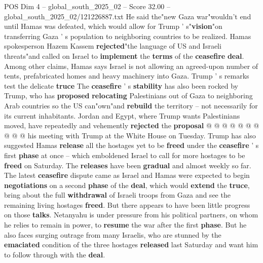 \begin{textsample}{POS Dim 4 – global\_south\_2025\_02 – Score 32.00 – global\_south\_2025\_02/121226887.txt}
He said the"new Gaza war"wouldn't end until Hamas was defeated, which would allow for Trump ' s"\textbf{vision}"on transferring Gaza ' s population to neighboring countries to be realized.
Hamas spokesperson Hazem Kassem \textbf{rejected}"the language of US and Israeli threats"and called on Israel to \textbf{implement} the \textbf{terms} of the \textbf{ceasefire} \textbf{deal}.
Among other claims, Hamas says Israel is not allowing an agreed-upon number of tents, prefabricated homes and heavy machinery into Gaza.
Trump ' s remarks test the delicate \textbf{truce} The \textbf{ceasefire} ' s \textbf{stability} has also been rocked by Trump, who has \textbf{proposed} \textbf{relocating} Palestinians out of Gaza to neighboring Arab countries so the US can"own"and \textbf{rebuild} the territory -- not necessarily for its current inhabitants.
Jordan and Egypt, where Trump wants Palestinians moved, have repeatedly and vehemently \textbf{rejected} the \textbf{proposal} @ @ @ @ @ @ @ @ @ @ his meeting with Trump at the White House on Tuesday.
Trump has also suggested Hamas \textbf{release} all the hostages yet to be \textbf{freed} under the \textbf{ceasefire} ' s first \textbf{phase} at once -- which emboldened Israel to call for more hostages to be \textbf{freed} on Saturday.
The \textbf{releases} have been \textbf{gradual} and almost weekly so far.
The latest \textbf{ceasefire} dispute came as Israel and Hamas were expected to begin \textbf{negotiations} on a second \textbf{phase} of the \textbf{deal}, which would \textbf{extend} the \textbf{truce}, bring about the full \textbf{withdrawal} of Israeli troops from Gaza and see the remaining living hostages \textbf{freed}.
But there appears to have been little progress on those \textbf{talks}.
Netanyahu is under pressure from his political partners, on whom he relies to remain in power, to \textbf{resume} the war after the first \textbf{phase}.
But he also faces surging outrage from many Israelis, who are stunned by the \textbf{emaciated} condition of the three hostages \textbf{released} last Saturday and want him to follow through with the \textbf{deal}.

\end{textsample}

